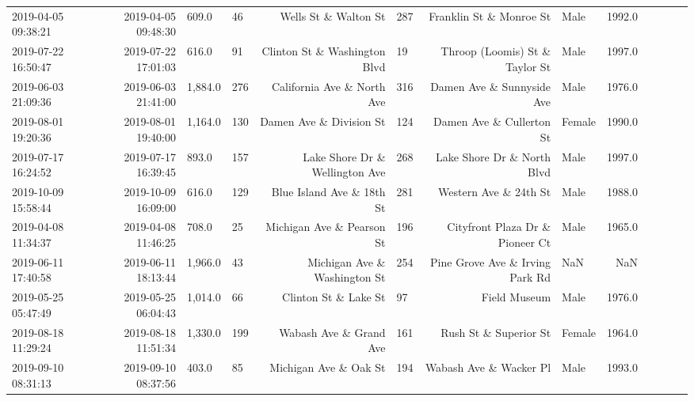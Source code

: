 \begin{table}[H]
{\begin{tabular}{lrllrlrlrlllr}
 2019-04-05 09:38:21 &  2019-04-05 09:48:30 &        609.0 &               46 &                  Wells St \& Walton St &            287 &               Franklin St \& Monroe St &    Male &     1992.0 \\
 2019-07-22 16:50:47 &  2019-07-22 17:01:03 &        616.0 &               91 &          Clinton St \& Washington Blvd &             19 &        Throop (Loomis) St \& Taylor St &    Male &     1997.0 \\
 2019-06-03 21:09:36 &  2019-06-03 21:41:00 &      1,884.0 &              276 &            California Ave \& North Ave &            316 &             Damen Ave \& Sunnyside Ave &    Male &     1976.0 \\
 2019-08-01 19:20:36 &  2019-08-01 19:40:00 &      1,164.0 &              130 &               Damen Ave \& Division St &            124 &              Damen Ave \& Cullerton St &  Female &     1990.0 \\
 2019-07-17 16:24:52 &  2019-07-17 16:39:45 &        893.0 &              157 &        Lake Shore Dr \& Wellington Ave &            268 &            Lake Shore Dr \& North Blvd &    Male &     1997.0 \\
 2019-10-09 15:58:44 &  2019-10-09 16:09:00 &        616.0 &              129 &             Blue Island Ave \& 18th St &            281 &                 Western Ave \& 24th St &    Male &     1988.0 \\
 2019-04-08 11:34:37 &  2019-04-08 11:46:25 &        708.0 &               25 &             Michigan Ave \& Pearson St &            196 &       Cityfront Plaza Dr \& Pioneer Ct &    Male &     1965.0 \\
 2019-06-11 17:40:58 &  2019-06-11 18:13:44 &      1,966.0 &               43 &          Michigan Ave \& Washington St &            254 &       Pine Grove Ave \& Irving Park Rd &     NaN &        NaN \\
 2019-05-25 05:47:49 &  2019-05-25 06:04:43 &      1,014.0 &               66 &                  Clinton St \& Lake St &             97 &                          Field Museum &    Male &     1976.0 \\
 2019-08-18 11:29:24 &  2019-08-18 11:51:34 &      1,330.0 &              199 &                Wabash Ave \& Grand Ave &            161 &                 Rush St \& Superior St &  Female &     1964.0 \\
 2019-09-10 08:31:13 &  2019-09-10 08:37:56 &        403.0 &               85 &                 Michigan Ave \& Oak St &            194 &                Wabash Ave \& Wacker Pl &    Male &     1993.0 \\

\end{tabular}}
\end{table}
